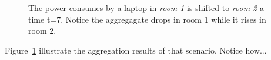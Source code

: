 \begin{figure}[htb!]
\begin{center}
\end{center}
\caption{
	The power consumes by a laptop in \emph{room 1} is shifted to \emph{room 2} a time t=7.  Notice the aggregagate drops in room 1
	while it rises in room 2.
     }%
\label{fig:multiroomagg}
\end{figure}

Figure~\ref{fig:multiroomagg} illustrate the aggregation results of that scenario.  Notice how...





